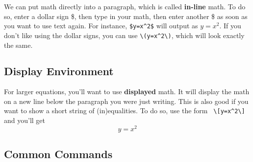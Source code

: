 \documentclass[12pt]{article}
\begin{document}
We can put math directly into a paragraph, which is called \textbf{in-line} math. 
To do so, enter a dollar sign \$, then type in your math, then enter another \$ as 
soon as you want to use text again. For instance, \verb|$y=x^2$|  will output as 
$y=x^2$. If you don't like using the dollar signs, you can use \verb|\(y=x^2\)|, 
which will look exactly the same.  


\subsection{Display Environment}

For larger equations, you'll want to use \textbf{displayed} math. It will display the 
math on a new line below the paragraph you were just writing. This is also good 
if you want to show a short string of (in)equalities.  To do so, use the form 
\verb| \[y=x^2\]| and you'll get
		\[y=x^2\]


\subsection{Common Commands}
\end{document}
